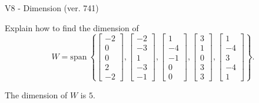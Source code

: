 \begin{exercise}
  \begin{exerciseTitle}V8 - Dimension (ver. 741)\end{exerciseTitle}
  \begin{exerciseStatement}
    Explain how to find the dimension of 
\[W=\mathrm{span}\ \left\{\left[\begin{array}{r}
-2 \\
0 \\
0 \\
2 \\
-2
\end{array}\right] , \left[\begin{array}{r}
-2 \\
-3 \\
1 \\
-3 \\
-1
\end{array}\right] , \left[\begin{array}{r}
1 \\
-4 \\
-1 \\
0 \\
0
\end{array}\right] , \left[\begin{array}{r}
3 \\
1 \\
0 \\
3 \\
3
\end{array}\right] , \left[\begin{array}{r}
1 \\
-4 \\
3 \\
-4 \\
1
\end{array}\right]\right\}.\]



  \end{exerciseStatement}
  \begin{exerciseAnswer}
   The dimension of \(W\) is  \(5\).
  


  \end{exerciseAnswer}
\end{exercise}